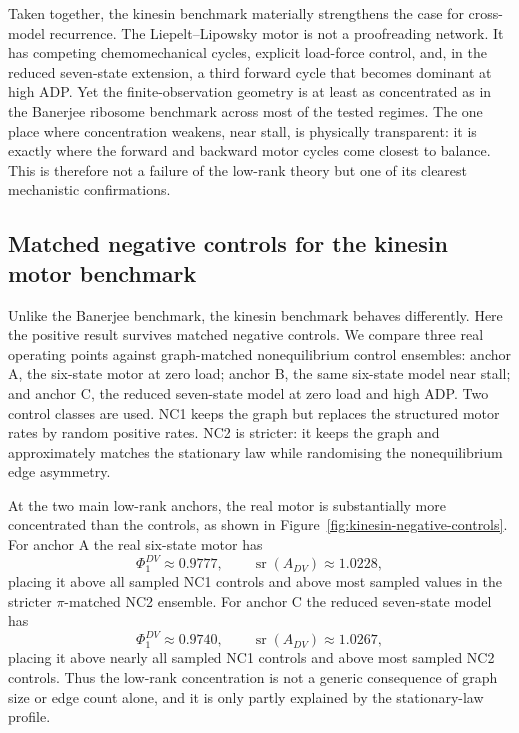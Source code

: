 \documentclass[11pt,a4paper]{article}
\numberwithin{equation}{section}
\theoremstyle{thmcompact}
\theoremstyle{remark}
\begin{document}
Taken together, the kinesin benchmark materially strengthens the case for cross-model recurrence. The Liepelt--Lipowsky motor is not a proofreading network. It has competing chemomechanical cycles, explicit load-force control, and, in the reduced seven-state extension, a third forward cycle that becomes dominant at high ADP. Yet the finite-observation geometry is at least as concentrated as in the Banerjee ribosome benchmark across most of the tested regimes. The one place where concentration weakens, near stall, is physically transparent: it is exactly where the forward and backward motor cycles come closest to balance. This is therefore not a failure of the low-rank theory but one of its clearest mechanistic confirmations.


\subsection{Matched negative controls for the kinesin motor benchmark}

Unlike the Banerjee benchmark, the kinesin benchmark behaves differently. Here the positive result survives matched negative controls. We compare three real operating points against graph-matched nonequilibrium control ensembles: anchor A, the six-state motor at zero load; anchor B, the same six-state model near stall; and anchor C, the reduced seven-state model at zero load and high ADP. Two control classes are used. NC1 keeps the graph but replaces the structured motor rates by random positive rates. NC2 is stricter: it keeps the graph and approximately matches the stationary law while randomising the nonequilibrium edge asymmetry.

At the two main low-rank anchors, the real motor is substantially more concentrated than the controls, as shown in Figure~\ref{fig:kinesin-negative-controls}. For anchor A the real six-state motor has
\begin{equation}
\Phi^{DV}_{1}\approx 0.9777,
\qquad
\operatorname{sr}(A_{DV})\approx 1.0228,
\end{equation}
placing it above all sampled NC1 controls and above most sampled values in the stricter $\pi$-matched NC2 ensemble. For anchor C the reduced seven-state model has
\begin{equation}
\Phi^{DV}_{1}\approx 0.9740,
\qquad
\operatorname{sr}(A_{DV})\approx 1.0267,
\end{equation}
placing it above nearly all sampled NC1 controls and above most sampled NC2 controls. Thus the low-rank concentration is not a generic consequence of graph size or edge count alone, and it is only partly explained by the stationary-law profile.
\end{document}
